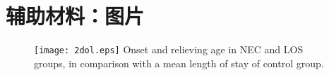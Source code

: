 \chapter{辅助材料：图片}
\label{app:archive}
\begin{figure}[!htp]
  \centering
  \texttt{[image: 2dol.eps]}
    {Onset and relieving age in NEC and LOS groups, in comparison with a mean length of stay of control group.}
  \label{fig:2dol}
\end{figure}

%
